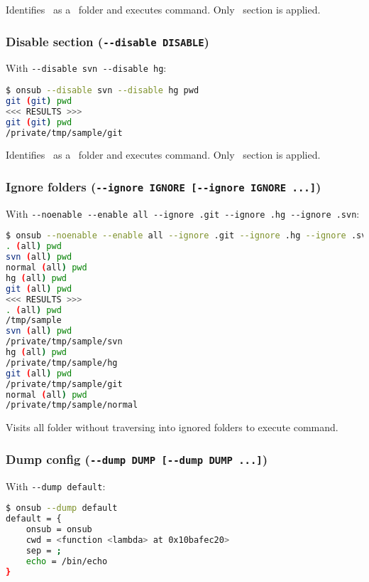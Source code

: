 Identifies \git\ as a \Git\ folder and executes command. Only \git\ section is applied.

\subsubsection*{Disable section (\lstinline{--disable DISABLE})}

With \lstinline{--disable svn --disable hg}:

\begin{snugshade}
\begin{lstlisting}[language=bash]
$ onsub --disable svn --disable hg pwd
git (git) pwd
<<< RESULTS >>>
git (git) pwd
/private/tmp/sample/git
\end{lstlisting}
\end{snugshade}

Identifies \git\ as a \Git\ folder and executes command. Only \git\ section is applied.

\subsubsection*{Ignore folders (\lstinline{--ignore IGNORE [--ignore IGNORE ...]})}

With \lstinline{--noenable --enable all --ignore .git --ignore .hg --ignore .svn}:

\begin{snugshade}
\begin{lstlisting}[language=bash]
$ onsub --noenable --enable all --ignore .git --ignore .hg --ignore .svn pwd
. (all) pwd
svn (all) pwd
normal (all) pwd
hg (all) pwd
git (all) pwd
<<< RESULTS >>>
. (all) pwd
/tmp/sample
svn (all) pwd
/private/tmp/sample/svn
hg (all) pwd
/private/tmp/sample/hg
git (all) pwd
/private/tmp/sample/git
normal (all) pwd
/private/tmp/sample/normal
\end{lstlisting}
\end{snugshade}

Visits all folder without traversing into ignored folders to execute command.

\subsubsection*{Dump config (\lstinline{--dump DUMP [--dump DUMP ...]})}

With \lstinline{--dump default}:

\begin{snugshade}
\begin{lstlisting}[language=bash]	
$ onsub --dump default
default = {
	onsub = onsub
	cwd = <function <lambda> at 0x10bafec20>
	sep = ;
	echo = /bin/echo
}
\end{lstlisting}
\end{snugshade}

